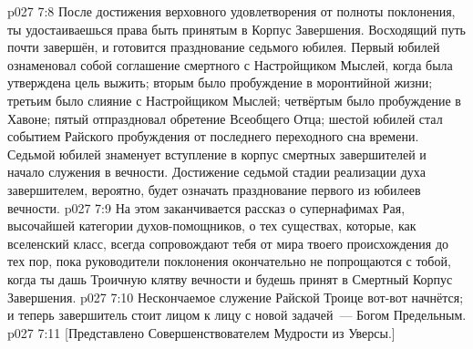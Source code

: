 \vs p027 7:8 \pc После достижения верховного удовлетворения от полноты поклонения, ты удостаиваешься права быть принятым в Корпус Завершения. Восходящий путь почти завершён, и готовится празднование седьмого юбилея. Первый юбилей ознаменовал собой соглашение смертного с Настройщиком Мыслей, когда была утверждена цель выжить; вторым было пробуждение в моронтийной жизни; третьим было слияние с Настройщиком Мыслей; четвёртым было пробуждение в Хавоне; пятый отпраздновал обретение Всеобщего Отца; шестой юбилей стал событием Райского пробуждения от последнего переходного сна времени. Седьмой юбилей знаменует вступление в корпус смертных завершителей и начало служения в вечности. Достижение седьмой стадии реализации духа завершителем, вероятно, будет означать празднование первого из юбилеев вечности.
\vs p027 7:9 \pc На этом заканчивается рассказ о супернафимах Рая, высочайшей категории духов\hyp{}помощников, о тех существах, которые, как вселенский класс, всегда сопровождают тебя от мира твоего происхождения до тех пор, пока руководители поклонения окончательно не попрощаются с тобой, когда ты дашь Троичную клятву вечности и будешь принят в Смертный Корпус Завершения.
\vs p027 7:10 Нескончаемое служение Райской Троице вот\hyp{}вот начнётся; и теперь завершитель стоит лицом к лицу с новой задачей~--- Богом Предельным.
\vsetoff
\vs p027 7:11 [Представлено Совершенствователем Мудрости из Уверсы.]
\quizlink
